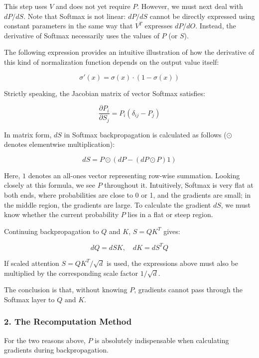 This step uses \(V\) and does not yet require \(P\). However, we must next deal with \(dP/dS\). Note that Softmax is not linear: \(dP/dS\) cannot be directly expressed using constant parameters in the same way that \(V^T\) expresses \(dP/dO\). Instead, the derivative of Softmax necessarily uses the values of \(P\) (or \(S\)).

The following expression provides an intuitive illustration of how the derivative of this kind of normalization function depends on the output value itself:

\[
\sigma'(x) = \sigma(x)\cdot(1-\sigma(x))
\]

Strictly speaking, the Jacobian matrix of vector Softmax satisfies:

\[
\frac{\partial P_i}{\partial S_j} = P_i(\delta_{ij}-P_j)
\]

In matrix form, \(dS\) in Softmax backpropagation is calculated as follows (\(\odot\) denotes elementwise multiplication):

\[
dS = P \odot \left(dP - (dP \odot P)1\right)
\]

Here, \(1\) denotes an all-ones vector representing row-wise summation. Looking closely at this formula, we see \(P\) throughout it. Intuitively, Softmax is very flat at both ends, where probabilities are close to 0 or 1, and the gradients are small; in the middle region, the gradients are large. To calculate the gradient \(dS\), we must know whether the current probability \(P\) lies in a flat or steep region.

Continuing backpropagation to \(Q\) and \(K\), \(S = QK^T\) gives:

\[
dQ = dS K,\quad dK = dS^T Q
\]

If scaled attention \(S = QK^T/\sqrt{d}\) is used, the expressions above must also be multiplied by the corresponding scale factor \(1/\sqrt{d}\).

The conclusion is that, without knowing \(P\), gradients cannot pass through the Softmax layer to \(Q\) and \(K\).

\hypertarget{the-recomputation-method}{%
\subsubsection{2. The Recomputation Method}\label{the-recomputation-method}}

For the two reasons above, \(P\) is absolutely indispensable when calculating gradients during backpropagation.

